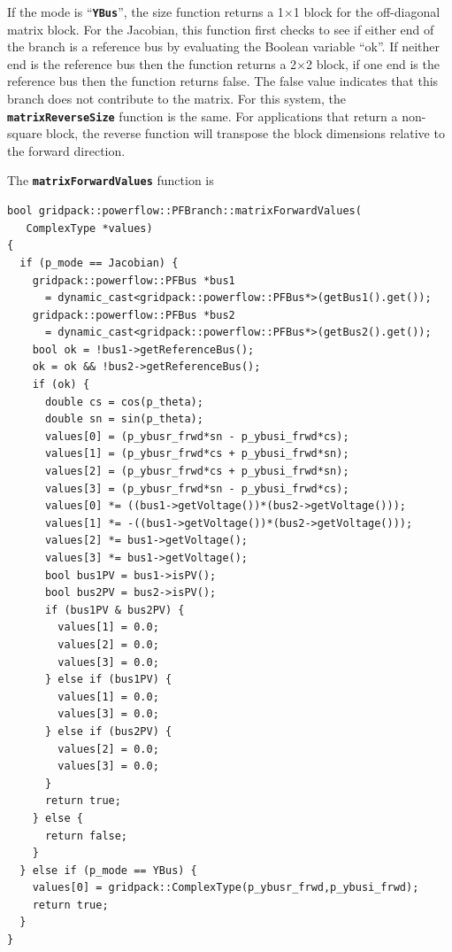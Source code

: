If the mode is ``\texttt{\textbf{YBus}}'', the size function returns a 1$\mathrm{\times}$1 block for the off-diagonal matrix block. For the Jacobian, this function first checks to see if either end of the branch is a reference bus by evaluating the Boolean variable ``ok''. If neither end is the reference bus then the function returns a 2$\mathrm{\times}$2 block, if one end is the reference bus then the function returns false. The false value indicates that this branch does not contribute to the matrix. For this system, the \texttt{\textbf{matrixReverseSize}} function is the same. For applications that return a non-square block, the reverse function will transpose the block dimensions relative to the forward direction.

The \texttt{\textbf{matrixForwardValues}} function is

{
\color{red}
\begin{Verbatim}[fontseries=b]
bool gridpack::powerflow::PFBranch::matrixForwardValues(
   ComplexType *values)
{
  if (p_mode == Jacobian) {
    gridpack::powerflow::PFBus *bus1
      = dynamic_cast<gridpack::powerflow::PFBus*>(getBus1().get());
    gridpack::powerflow::PFBus *bus2
      = dynamic_cast<gridpack::powerflow::PFBus*>(getBus2().get());
    bool ok = !bus1->getReferenceBus();
    ok = ok && !bus2->getReferenceBus();
    if (ok) {
      double cs = cos(p_theta);
      double sn = sin(p_theta);
      values[0] = (p_ybusr_frwd*sn - p_ybusi_frwd*cs);
      values[1] = (p_ybusr_frwd*cs + p_ybusi_frwd*sn);
      values[2] = (p_ybusr_frwd*cs + p_ybusi_frwd*sn);
      values[3] = (p_ybusr_frwd*sn - p_ybusi_frwd*cs);
      values[0] *= ((bus1->getVoltage())*(bus2->getVoltage()));
      values[1] *= -((bus1->getVoltage())*(bus2->getVoltage()));
      values[2] *= bus1->getVoltage();
      values[3] *= bus1->getVoltage();
      bool bus1PV = bus1->isPV();
      bool bus2PV = bus2->isPV();
      if (bus1PV & bus2PV) {
        values[1] = 0.0;
        values[2] = 0.0;
        values[3] = 0.0;
      } else if (bus1PV) {
        values[1] = 0.0;
        values[3] = 0.0;
      } else if (bus2PV) {
        values[2] = 0.0;
        values[3] = 0.0;
      }
      return true;
    } else {
      return false;
    }
  } else if (p_mode == YBus) {
    values[0] = gridpack::ComplexType(p_ybusr_frwd,p_ybusi_frwd);
    return true;
  }
}
\end{Verbatim}
}

